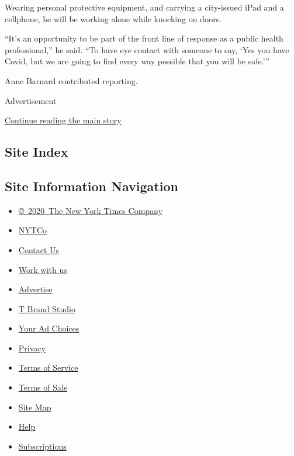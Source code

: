 Wearing personal protective equipment, and carrying a city-issued iPad
and a cellphone, he will be working alone while knocking on doors.

``It's an opportunity to be part of the front line of response as a
public health professional,'' he said. ``To have eye contact with
someone to say, `Yes you have Covid, but we are going to find every way
possible that you will be safe.'''

Anne Barnard contributed reporting.

Advertisement

\protect\hyperlink{after-bottom}{Continue reading the main story}

\hypertarget{site-index}{%
\subsection{Site Index}\label{site-index}}

\hypertarget{site-information-navigation}{%
\subsection{Site Information
Navigation}\label{site-information-navigation}}

\begin{itemize}
\tightlist
\item
  \href{https://help.nytimes3xbfgragh.onion/hc/en-us/articles/115014792127-Copyright-notice}{©~2020~The
  New York Times Company}
\end{itemize}

\begin{itemize}
\tightlist
\item
  \href{https://www.nytco.com/}{NYTCo}
\item
  \href{https://help.nytimes3xbfgragh.onion/hc/en-us/articles/115015385887-Contact-Us}{Contact
  Us}
\item
  \href{https://www.nytco.com/careers/}{Work with us}
\item
  \href{https://nytmediakit.com/}{Advertise}
\item
  \href{http://www.tbrandstudio.com/}{T Brand Studio}
\item
  \href{https://www.nytimes3xbfgragh.onion/privacy/cookie-policy\#how-do-i-manage-trackers}{Your
  Ad Choices}
\item
  \href{https://www.nytimes3xbfgragh.onion/privacy}{Privacy}
\item
  \href{https://help.nytimes3xbfgragh.onion/hc/en-us/articles/115014893428-Terms-of-service}{Terms
  of Service}
\item
  \href{https://help.nytimes3xbfgragh.onion/hc/en-us/articles/115014893968-Terms-of-sale}{Terms
  of Sale}
\item
  \href{https://spiderbites.nytimes3xbfgragh.onion}{Site Map}
\item
  \href{https://help.nytimes3xbfgragh.onion/hc/en-us}{Help}
\item
  \href{https://www.nytimes3xbfgragh.onion/subscription?campaignId=37WXW}{Subscriptions}
\end{itemize}
